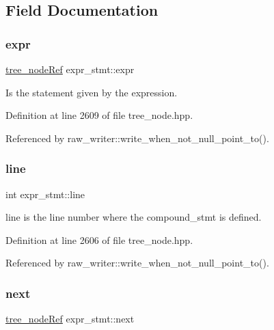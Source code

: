 \subsection{Field Documentation}
\mbox{\label{structexpr__stmt_a3be5eb629c0d2d3e6680f3df319d45b3}} 
\subsubsection{\texorpdfstring{expr}{expr}}
{\footnotesize\ttfamily \hyperlink{tree__node_8hpp_a6ee377554d1c4871ad66a337eaa67fd5}{tree\+\_\+node\+Ref} expr\+\_\+stmt\+::expr}



Is the statement given by the expression. 



Definition at line 2609 of file tree\+\_\+node.\+hpp.



Referenced by raw\+\_\+writer\+::write\+\_\+when\+\_\+not\+\_\+null\+\_\+point\+\_\+to().

\mbox{\label{structexpr__stmt_a505090c6214112d2456f6891439e3bb5}} 
\subsubsection{\texorpdfstring{line}{line}}
{\footnotesize\ttfamily int expr\+\_\+stmt\+::line}



line is the line number where the compound\+\_\+stmt is defined. 



Definition at line 2606 of file tree\+\_\+node.\+hpp.



Referenced by raw\+\_\+writer\+::write\+\_\+when\+\_\+not\+\_\+null\+\_\+point\+\_\+to().

\mbox{\label{structexpr__stmt_a01ecbff4b58cd37ea26fd2f682e8f050}} 
\subsubsection{\texorpdfstring{next}{next}}
{\footnotesize\ttfamily \hyperlink{tree__node_8hpp_a6ee377554d1c4871ad66a337eaa67fd5}{tree\+\_\+node\+Ref} expr\+\_\+stmt\+::next}



